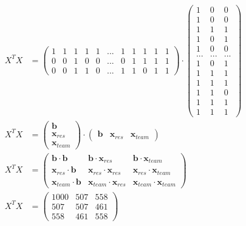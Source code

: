 \begin{align}
X^T X &=
\left(\begin{array}{ccccccccccc}
          1 & 1 & 1 & 1 & 1 & ... & 1 & 1 & 1 & 1 & 1 \\
          0 & 0 & 1 & 0 & 0 & ... & 0 & 1 & 1 & 1 & 1 \\
          0 & 0 & 1 & 1 & 0 & ... & 1 & 1 & 0 & 1 & 1
\end{array}\right)
\cdot
\left(\begin{array}{ccc}
     1    &  0    &  0   \\ 
     1    &  0    &  0   \\  
     1    &  1    &  1   \\  
     1    &  0    &  1   \\  
     1    &  0    &  0   \\  
     ...  &  ...  &  ... \\  
     1    &  0    &  1   \\  
     1    &  1    &  1   \\  
     1    &  1    &  1   \\  
     1    &  1    &  0   \\  
     1    &  1    &  1   \\  
     1    &  1    &  1     
\end{array}\right)
\\
X^T X &=
\left(\begin{array}{l}
          \mathbf{b} \\
          \mathbf{x}_\mathit{res} \\
          \mathbf{x}_\mathit{team} 
\end{array}\right)
\cdot
\left(\begin{array}{ccc}
     \mathbf{b} & \mathbf{x}_\mathit{res} & \mathbf{x}_\mathit{team}  
\end{array}\right)
\\
X^T X &=
\left(\begin{array}{lll}
          \mathbf{b} \cdot \mathbf{b} 
              & \mathbf{b} \cdot \mathbf{x}_\mathit{res} 
              & \mathbf{b} \cdot \mathbf{x}_\mathit{team}   
              \\
          \mathbf{x}_\mathit{res} \cdot \mathbf{b}  
              & \mathbf{x}_\mathit{res} \cdot \mathbf{x}_\mathit{res} 
              & \mathbf{x}_\mathit{res} \cdot \mathbf{x}_\mathit{team}   
              \\
          \mathbf{x}_\mathit{team} \cdot \mathbf{b}  
              & \mathbf{x}_\mathit{team} \cdot \mathbf{x}_\mathit{res}     
              & \mathbf{x}_\mathit{team} \cdot \mathbf{x}_\mathit{team}    
\end{array}\right)
\\
X^T X &=
\left(\begin{array}{ccc}
          1000 & 507 & 558 \\
           507 & 507 & 461 \\
           558 & 461 & 558
\end{array}\right)
\end{align}
